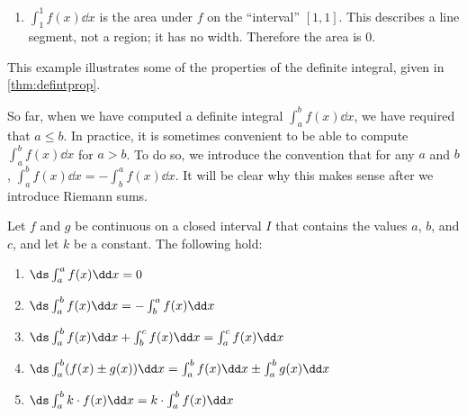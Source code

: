 \begin{example}
\begin{enumerate}
		
	\item	$\int_1^1f(x)\dd x$ is the area under $f$ on the ``interval'' $[1,1]$. This describes a line segment, not a region; it has no width. Therefore the area is 0.
\end{enumerate}
\end{example}

This example illustrates some of the properties of the definite integral, given in \autoref{thm:defintprop}.

So far, when we have computed a definite integral $\int_a^b f(x)\dd x$, we have required that $a\leq b$. In practice, it is sometimes convenient to be able to compute $\int_a^b f(x)\dd x$ for $a>b$. To do so, we introduce the convention that for any $a$ and $b$, $\int_a^b f(x)\dd x=-\int_b^a f(x)\dd x$. It will be clear why this makes sense after we introduce Riemann sums.

\begin{theorem}\label{thm:defintprop}%
Let $f$ and $g$ be continuous on a closed interval $I$ that contains the values $a$, $b$, and $c$, and let $k$ be a constant. The following hold:
\begin{enumerate}
	\item $\ds\int_a^a f(x)\dd x=0$
	\item $\ds\int_a^b f(x)\dd x=-\int_b^a f(x)\dd x$
	\item $\ds\int_a^b f(x)\dd x+\int_b^c f(x)\dd x=\int_a^c f(x)\dd x$
	\item $\ds\int_a^b (f(x)\pm g(x))\dd x =\int_a^b f(x)\dd x \pm \int_a^b g(x)\dd x$
	\item $\ds\int_a^b k\cdot f(x)\dd x =k\cdot \int_a^b f(x)\dd x$
\end{enumerate}%
\end{theorem}

